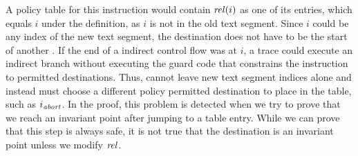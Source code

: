 {    A policy table for this instruction would contain $\mathit{rel}(i)$ as one of its entries, which equals $i$ under the \naive{} definition, as $i$ is not in the old text segment.
    Since $i$ could be any index of the new text segment, the destination does not have to be the start of another \Block.
    If the end of a indirect control flow \Block was at $i$, a trace could execute an indirect branch without executing the guard code
    that constrains the instruction to permitted destinations. Thus, \itoip cannot leave new text segment indices alone
    and instead must choose a different policy permitted destination to place in the table, such as $i_\mathit{abort}$.
    In the proof, this problem is detected when we try to prove that we reach an invariant point after jumping to a table entry.
    While we can prove that this step is always safe, it is not true that the destination is an invariant point unless we modify $\mathit{rel}$.
}

